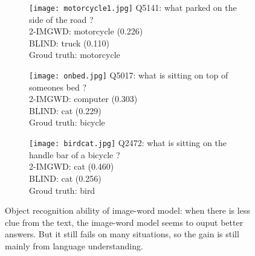 \begin{figure}\footnotesize
\begin{subfigure}[t]{0.3\textwidth}
    \texttt{[image: motorcycle1.jpg]}
    Q5141: what parked on the side of the road ?\\
    2-IMGWD: motorcycle (0.226)\\
    BLIND: truck (0.110)\\
    Groud truth: motorcycle
\end{subfigure}
\quad
\begin{subfigure}[t]{0.3\textwidth}
    \texttt{[image: onbed.jpg]}
    Q5017: what is sitting on top of someones bed ?\\
    2-IMGWD: computer (0.303)\\
    BLIND: cat (0.229)\\
    Groud truth: bicycle
\end{subfigure}
\quad
\begin{subfigure}[t]{0.3\textwidth}
    \texttt{[image: birdcat.jpg]}
    Q2472: what is sitting on the handle bar of a bicycle ?\\
    2-IMGWD: cat (0.460)\\
    BLIND: cat (0.256)\\
    Groud truth: bird
\end{subfigure}

\caption{Object recognition ability of image-word model: when there is less clue from the text, the image-word model seems to ouput better answers. But it still fails on many situations, so the gain is still mainly from language understanding.}
\label{fig:cocoqa_object}
\end{figure}




